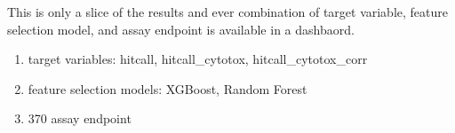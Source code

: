 This is only a slice of the results and ever combination of target variable, feature selection model, and assay endpoint is available in a dashbaord.
\begin{enumerate}
  \item target variables: hitcall, hitcall\_cytotox, hitcall\_cytotox\_corr
  \item feature selection models: XGBoost, Random Forest
  \item 370 assay endpoint
\end{enumerate}
